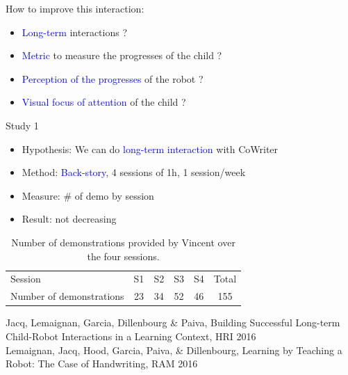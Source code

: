 \documentclass[compress]{beamer}
\renewcommand{\bf}{\Medium}
\begin{document}
\begin{frame}

{\bf How to improve this interaction}:
\begin{itemize}
\item \textcolor{blue}{Long-term} interactions ?
\item \textcolor{blue}{Metric} to measure the progresses of the child ?
\item \textcolor{blue}{Perception of the progresses} of the robot ? %
\item \textcolor{blue}{Visual focus of attention} of the child ? 
\end{itemize}
\end{frame}

\begin{frame}{Study 1}

    \begin{itemize}
    \item {\bf Hypothesis}: We can do \textcolor{blue}{long-term interaction} with CoWriter
    \item {\bf Method}: \textcolor{blue}{Back-story}, 4 sessions of 1h, 1 session/week
    \item {\bf Measure}: \# of demo by session
    \item {\bf Result}: not decreasing
    \end{itemize}
    
    \begin{table}
    \centering
    \caption{\footnotesize Number of demonstrations provided by Vincent over the four sessions.}
    \begin{tabular}{lccccc}
        \toprule
        Session & S1 & S2 & S3 & S4 & Total\\ 
        Number of demonstrations & 23 & 34 & 52 & 46 & 155\\ 
        \bottomrule

    \end{tabular}
\end{table}

\tiny{Jacq, Lemaignan, Garcia, Dillenbourg \& Paiva, {\bf Building Successful Long-term Child-Robot Interactions in a Learning Context}, HRI 2016}\\
\tiny{Lemaignan, Jacq, Hood, Garcia, Paiva, \& Dillenbourg, {\bf Learning by Teaching a Robot: The Case of Handwriting}, RAM 2016}
\end{frame}

\end{document}
